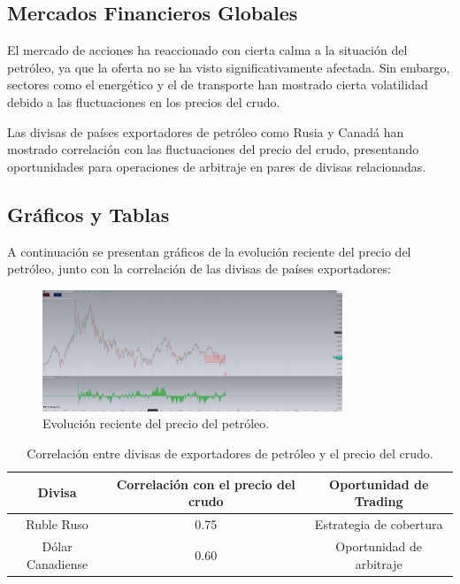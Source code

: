 \documentclass{article}
\begin{document}
\subsection{Mercados Financieros Globales}
El mercado de acciones ha reaccionado con cierta calma a la situación del petróleo, ya que la oferta no se ha visto significativamente afectada. Sin embargo, sectores como el energético y el de transporte han mostrado cierta volatilidad debido a las fluctuaciones en los precios del crudo.

Las divisas de países exportadores de petróleo como Rusia y Canadá han mostrado correlación con las fluctuaciones del precio del crudo, presentando oportunidades para operaciones de arbitraje en pares de divisas relacionadas.

\subsection{Gráficos y Tablas}
A continuación se presentan gráficos de la evolución reciente del precio del petróleo, junto con la correlación de las divisas de países exportadores:

\begin{figure}[h!]
\centering
\includegraphics[width=0.8\textwidth]{images/Captura de pantalla 2024-10-10 133834.png}
\caption{Evolución reciente del precio del petróleo.}
\end{figure}

\begin{table}[h!]
\centering
\begin{tabular}{|c|c|c|}
\hline
Divisa & Correlación con el precio del crudo & Oportunidad de Trading \\
\hline
Ruble Ruso & 0.75 & Estrategia de cobertura \\
Dólar Canadiense & 0.60 & Oportunidad de arbitraje \\
\hline
\end{tabular}
\caption{Correlación entre divisas de exportadores de petróleo y el precio del crudo.}
\end{table}
\end{document}
